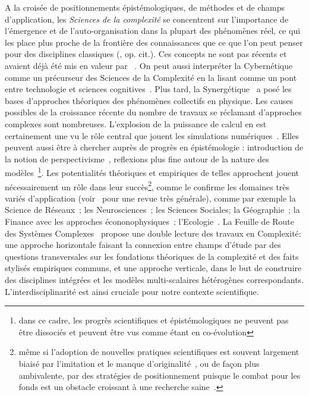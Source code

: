 {}{
A la croisée de positionnements épistémologiques, de méthodes et de champs d'application, les \emph{Sciences de la complexité} se concentrent sur l'importance de l'émergence et de l'auto-organisation dans la plupart des phénomènes réel, ce qui les place plus proche de la frontière des connaissances que ce que l'on peut penser pour des disciplines classiques (, op. cit.). Ces concepts ne sont pas récents et avaient déjà été mis en valeur par ~\cite{anderson1972more}. On peut aussi interpréter la Cybernétique comme un précurseur des Sciences de la Complexité en la lisant comme un pont entre technologie et sciences cognitives~\cite{wiener1948cybernetics}. Plus tard, la Synergétique~\cite{haken1980synergetics} a posé les bases d'approches théoriques des phénomènes collectifs en physique. Les causes possibles de la croissance récente du nombre de travaux se réclamant d'approches complexes sont nombreuses. L'explosion de la puissance de calcul en est certainement une vu le rôle central que jouent les simulations numériques~\cite{varenne2010simulations}. Elles peuvent aussi être à chercher auprès de progrès en épistémologie : introduction de la notion de perspectivisme~\cite{giere2010scientific}, reflexions plus fine autour de la nature des modèles~\cite{varenne2013modeliser}\footnote{dans ce cadre, les progrès scientifiques et épistémologiques ne peuvent pas être dissociés et peuvent être vus comme étant en co-évolution}. Les potentialités théoriques et empiriques de telles approchent jouent nécessairement un rôle dans leur succès\footnote{même si l'adoption de nouvelles pratiques scientifiques est souvent largement biaisé par l'imitation et le manque d'originalité~\cite{dirk1999measure}, ou de façon plus ambivalente, par des stratégies de positionnement puisque le combat pour les fonds est un obstacle croissant à une recherche saine~\cite{bollen2014funding}.}, comme le confirme les domaines très variés d'application (voir~\cite{newman2011complex} pour une revue très générale), comme par exemple la Science de Réseaux~\cite{barabasi2002linked}; les Neurosciences~\cite{koch1999complexity}; les Sciences Sociales; la Géographie~\cite{manson2001simplifying}\cite{pumain1997pour}; la Finance avec les approches écononophysiques~\cite{stanley1999econophysics}; l'Ecologie~\cite{grimm2005pattern}. La Feuille de Route des Systèmes Complexes~\cite{2009arXiv0907.2221B} propose une double lecture des travaux en Complexité: une approche horizontale faisant la connexion entre champs d'étude par des questions transversales sur les fondations théoriques de la complexité et des faits stylisés empiriques communs, et une approche verticale, dans le but de construire des disciplines intégrées et les modèles multi-scalaires hétérogènes correspondants. L'interdisciplinarité est ainsi cruciale pour notre contexte scientifique.
}




